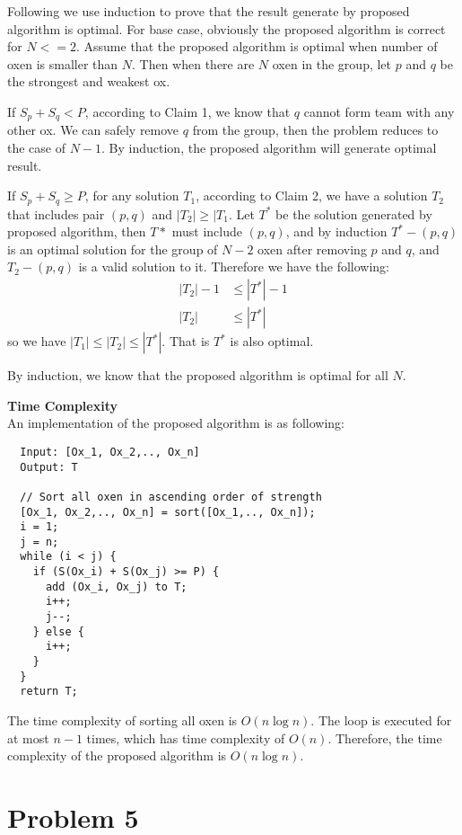 \documentclass{article}
\newcommand{\Complexity}{\vspace{0.3cm} \noindent\textbf{Time Complexity} \\}
\begin{document}
\vspace{0.3cm}
Following we use induction to prove that the result generate by proposed algorithm is optimal.
For base case, obviously the proposed algorithm is correct for $N <= 2$.  
Assume that the proposed algorithm is optimal when number of oxen is smaller than $N$. Then when
there are $N$ oxen in the group, let $p$ and $q$ be the strongest and weakest ox.

If $S_p + S_q < P$, according to Claim 1, we know that $q$ cannot form team with any other ox. We
can safely remove $q$ from the group, then the problem reduces to the case of $N-1$. By induction,
the proposed algorithm will generate optimal result.

If $S_p + S_q \geq P$, for any solution $T_1$, according to Claim 2, we have a solution $T_2$ that
includes pair $(p, q)$ and $|T_2| \geq |T_1$. Let $T^*$ be the solution generated by proposed
algorithm, then $T*$ must include $(p, q)$, and by induction $T^* - (p, q)$ is an optimal solution for the group
of $N-2$ oxen after removing $p$ and $q$, and $T_2 - (p, q)$ is a valid solution to it. Therefore we
have the following:
\begin{align}
  |T_2| - 1 & \leq |T^*| - 1 \\
  |T_2| & \leq |T^*|
\end{align}
so we have $|T_1| \leq |T_2| \leq |T^*|$. That is $T^*$ is also optimal.

By induction, we know that the proposed algorithm is optimal for all $N$.

\Complexity
An implementation of the proposed algorithm is as following:
\begin{verbatim}
  Input: [Ox_1, Ox_2,.., Ox_n]
  Output: T
  
  // Sort all oxen in ascending order of strength
  [Ox_1, Ox_2,.., Ox_n] = sort([Ox_1,.., Ox_n]);
  i = 1;
  j = n;
  while (i < j) {
    if (S(Ox_i) + S(Ox_j) >= P) {
      add (Ox_i, Ox_j) to T;
      i++;
      j--;
    } else {
      i++;
    }
  }
  return T;
\end{verbatim}

The time complexity of sorting all oxen is $O(n\log n)$. The loop is executed for at most $n-1$
times, which has time complexity of $O(n)$. Therefore, the time complexity of the proposed algorithm
is $O(n\log n)$.

\section*{Problem 5}
\end{document}
